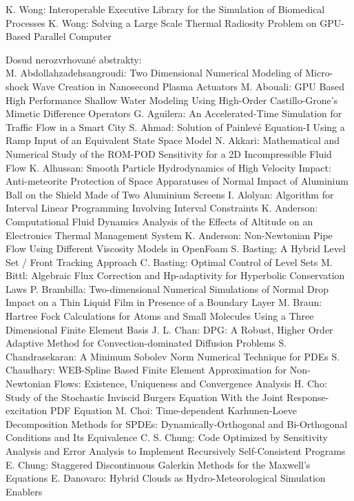 \documentclass[10pt, A4]{article}%
\begin{document}
{K. Wong}: {Interoperable Executive Library for the Simulation of Biomedical Processes}
{K. Wong}: {Solving a Large Scale Thermal Radiosity Problem on GPU-Based Parallel Computer}

\newpage
Dosud nerozvrhované abstrakty:\\
{M. Abdollahzadehsangroudi}: {Two Dimensional Numerical Modeling of Micro-shock Wave Creation in Nanosecond Plasma Actuators}
{M. Abouali}: {GPU Based High Performance Shallow Water Modeling Using High-Order Castillo-Grone's Mimetic Difference Operators}
{G. Aguilera}: {An Accelerated-Time Simulation for Traffic Flow in a Smart City}
{S. Ahmad}: {Solution of Painlevé Equation-I Using a Ramp Input of an Equivalent State Space Model}
{N. Akkari}: {Mathematical and Numerical Study of the ROM-POD Sensitivity for a 2D Incompressible Fluid Flow}
{K. Alhussan}: {Smooth Particle Hydrodynamics of High Velocity Impact: Anti-meteorite Protection of Space Apparatuses of Normal Impact of Aluminium Ball on the Shield Made of Two Aluminium Screens}
{I. Alolyan}: {Algorithm for Interval Linear  Programming Involving Interval Constraints}
{K. Anderson}: {Computational Fluid Dynamics Analysis of the Effects of Altitude on an Electronics Thermal Management System}
{K. Anderson}: {Non-Newtonian Pipe Flow Using Different Viscosity Models in OpenFoam}
{S. Basting}: {A Hybrid Level Set / Front Tracking Approach}
{C. Basting}: {Optimal Control of Level Sets}
{M. Bittl}: {Algebraic Flux Correction and Hp-adaptivity for Hyperbolic Conservation Laws}
{P. Brambilla}: {Two-dimensional Numerical Simulations of Normal Drop Impact on a Thin Liquid Film in Presence of a Boundary Layer}
{M. Braun}: {Hartree Fock Calculations for Atoms and Small Molecules Using  a Three Dimensional  Finite Element Basis}
{J. L. Chan}: {DPG: A Robust, Higher Order Adaptive Method for Convection-dominated Diffusion Problems}
{S. Chandrasekaran}: {A Minimum Sobolev Norm Numerical Technique for PDEs}
{S. Chaudhary}: {WEB-Spline Based Finite Element Approximation for Non-Newtonian Flows: Existence, Uniqueness and Convergence Analysis}
{H. Cho}: {Study of the Stochastic Inviscid Burgers Equation With the Joint Response-excitation PDF Equation}
{M. Choi}: {Time-dependent Karhunen-Loeve Decomposition Methods for SPDEs: Dynamically-Orthogonal and Bi-Orthogonal Conditions and Its Equivalence}
{C. S. Chung}: {Code Optimized by Sensitivity Analysis and Error Analysis to Implement Recursively Self-Consistent Programs}
{E. Chung}: {Staggered Discontinuous Galerkin Methods for the Maxwell's Equations}
{E. Danovaro}: {Hybrid Clouds as Hydro-Meteorological Simulation Enablers}
\end{document}
